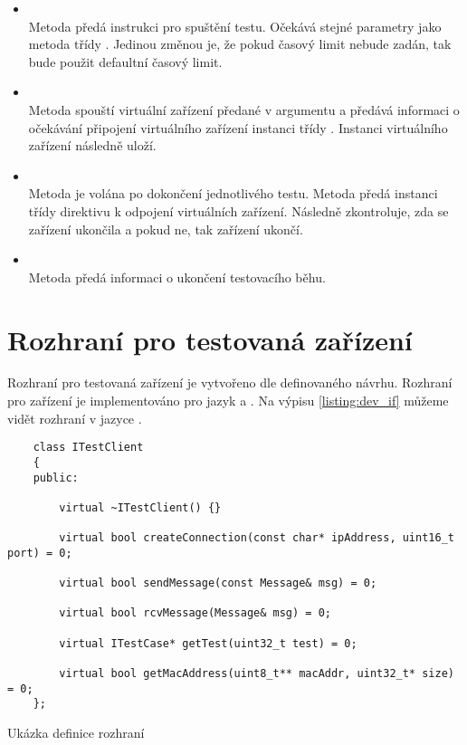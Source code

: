 \begin{itemize}
    \item {} \\ Metoda předá instrukci pro spuštění testu. Očekává stejné parametry jako metoda  třídy . Jedinou změnou je, že pokud časový limit nebude zadán, tak bude použit defaultní časový limit.
    \item {} \\ Metoda spouští virtuální zařízení předané v argumentu a předává informaci o očekávání připojení virtuálního zařízení instanci třídy . Instanci virtuálního zařízení následně uloží.
    \item {} \\ Metoda je volána po dokončení jednotlivého testu. Metoda předá instanci třídy  direktivu k odpojení virtuálních zařízení. Následně zkontroluje, zda se zařízení ukončila a pokud ne, tak zařízení ukončí.
    \item {} \\ Metoda předá informaci o ukončení testovacího běhu.
\end{itemize}


\section{Rozhraní pro testovaná zařízení}

Rozhraní pro testovaná zařízení je vytvořeno dle definovaného návrhu. Rozhraní pro zařízení je implementováno pro jazyk \csharp{} a \cpp{}. Na výpisu \ref{listing:dev_if} můžeme vidět rozhraní v jazyce \cpp{}. 

\begin{listing}[htbp]
    \begin{verbatim}
    class ITestClient
    {
    public:

        virtual ~ITestClient() {}

        virtual bool createConnection(const char* ipAddress, uint16_t port) = 0;

        virtual bool sendMessage(const Message& msg) = 0;

        virtual bool rcvMessage(Message& msg) = 0;

        virtual ITestCase* getTest(uint32_t test) = 0;

        virtual bool getMacAddress(uint8_t** macAddr, uint32_t* size) = 0;
    };
    \end{verbatim}
\caption{Ukázka definice rozhraní}
\label{listing:dev_if}
\end{listing}

